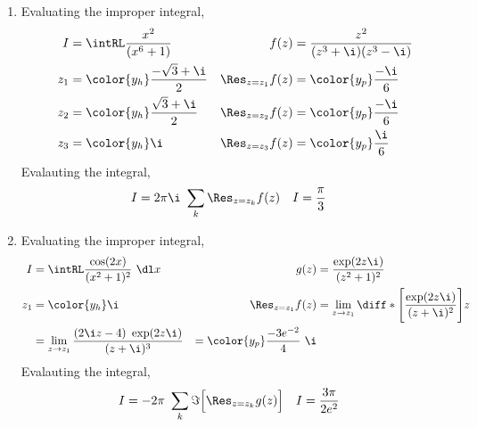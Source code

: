 \begin{enumerate}
    \item Evaluating the improper integral,
          \begin{align}
              I                   & = \intRL \frac{x^2}{(x^6 + 1)}         &
              f(z)                & = \frac{z^2}{(z^3 + \i)(z^3 - \i)}       \\
              z_1                 & = \color{y_h} \frac{-\sqrt{3} + \i}{2} &
              \Res_{z = z_1} f(z) & = \color{y_p} \frac{-\i}{6}              \\
              z_2                 & = \color{y_h} \frac{\sqrt{3} + \i}{2}  &
              \Res_{z = z_2} f(z) & = \color{y_p} \frac{-\i}{6}              \\
              z_3                 & = \color{y_h} \i                       &
              \Res_{z = z_3} f(z) & = \color{y_p} \frac{\i}{6}
          \end{align}
          Evalauting the integral,
          \begin{align}
              I & = 2\pi\i\ \sum_{k} \Res_{z = z_k} f(z) &
              I & = \frac{\pi}{3}
          \end{align}

    \item Evaluating the improper integral,
          \begin{align}
              I                   & = \intRL \frac{\cos(2x)}{(x^2 + 1)^2}\ \dl x      &
              g(z)                & = \frac{\exp(2z\i)}{(z^2 + 1)^2}                    \\
              z_1                 & = \color{y_h} \i                                  &
              \Res_{z = z_1} f(z) & = \lim_{z \to z_1} \diff*{\Bigg[
              \frac{\exp(2z\i)}{(z + \i)^2}\Bigg]}{z}                                   \\
                                  & = \lim_{z \to z_1} \frac{(2\i z - 4)\ \exp(2z\i)}
              {(z + \i)^3}
                                  & = \color{y_p} \frac{-3e^{-2}}{4}\ \i                \\
          \end{align}
          Evalauting the integral,
          \begin{align}
              I & = -2\pi\ \sum_{k} \Im{\Big[\Res_{z = z_k} g(z)\Big]} &
              I & = \frac{3\pi}{2e^2}
          \end{align}


\end{enumerate}

